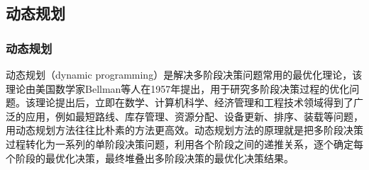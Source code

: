 
\subsection{动态规划}

\begin{frame}
    \frametitle{动态规划}
    动态规划（dynamic programming）是解决多阶段决策问题常用的最优化理论，该理论由美国数学家Bellman等人在1957年提出，用于研究多阶段决策过程的优化问题。该理论提出后，立即在数学、计算机科学、经济管理和工程技术领域得到了广泛的应用，例如最短路线、库存管理、资源分配、设备更新、排序、装载等问题，用动态规划方法往往比朴素的方法更高效。动态规划方法的原理就是把多阶段决策过程转化为一系列的单阶段决策问题，利用各个阶段之间的递推关系，逐个确定每个阶段的最优化决策，最终堆叠出多阶段决策的最优化决策结果。
\end{frame}


